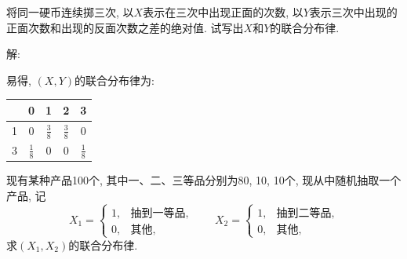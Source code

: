 \documentclass[standard]{ExBook}
\renewenvironment{shaded}{%
  \def\FrameCommand{\fboxsep=\FrameSep \colorbox{shadecolor}}%
  \MakeFramed{\advance\hsize-\width \FrameRestore}%
}{%
  \endMakeFramed
}
\begin{document}
\begin{qitems}
\vspace{2.5cm-5em}

    \begin{bbox}
    \begin{shaded}
        \qitem
将同一硬币连续掷三次, 以$X$表示在三次中出现正面的次数, 以$Y$表示三次中出现的正面次数和出现的反面次数之差的绝对值. 试写出$X$和$Y$的联合分布律.
    \end{shaded}
    \end{bbox}

\vspace{\dimexpr2.5cm-5em\relax}

解: 

易得, $(X,Y)$的联合分布律为:
\begin{footnotesize}
\begin{center}
    \renewcommand{\arraystretch}{1.5}
    \setlength{\tabcolsep}{25pt}
    \begin{tabular}{c|c|c|c|c}
	    \hline
	    \diagbox{$Y$}{$P(X,Y)$}{$X$} & 0 & 1 & 2 & 3 \\
	    \hline
	    1 & 0 & $\displaystyle\frac{3}{8}$ & $\displaystyle\frac{3}{8}$ & 0 \\
	    \hline
	    3 & $\displaystyle\frac{1}{8}$ & 0 & 0 & $\displaystyle\frac{1}{8}$\\
	    \hline
    \end{tabular}
\end{center}
\end{footnotesize}

\vspace{2.5cm-5em}

    \begin{bbox}
    \begin{shaded}
        \qitem
现有某种产品100个, 其中一、二、三等品分别为80, 10, 10个, 现从中随机抽取一个产品, 记
$$
    X_1=
    \left\{
    \begin{array}{ll}
        1, &\text{抽到一等品},\\
        0, &\text{其他},
    \end{array}
    \right.
    \qquad
    X_2=
    \left\{
    \begin{array}{ll}
        1, &\text{抽到二等品},\\
        0, &\text{其他},
    \end{array}
    \right.
$$
求$(X_1,X_2)$的联合分布律.
    \end{shaded}
    \end{bbox}

\vspace{\dimexpr2.5cm-5em\relax}


\end{qitems}
\end{document}
